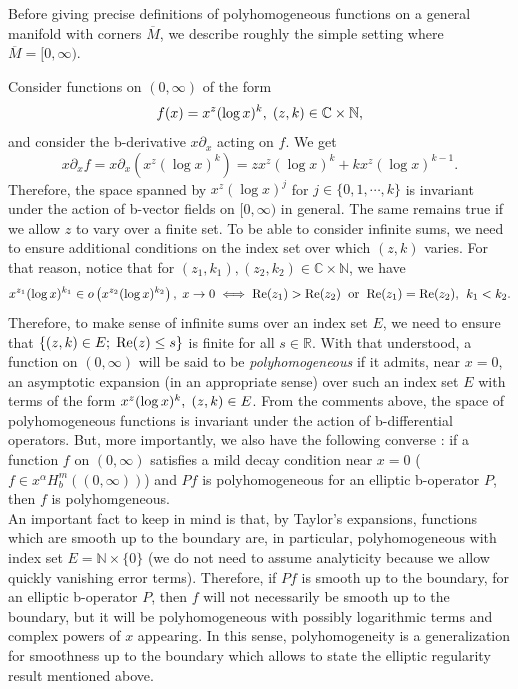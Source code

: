 \documentclass[a4paper,11pt]{article}
\def\C{\mathbb{C}}
\def\R{\mathbb{R}}
\def\N{\mathbb{N}}
\begin{document}
Before giving precise definitions of polyhomogeneous functions on a general manifold with corners $\overline{M}$, we describe roughly the simple setting where $\overline{M}=[0, \infty)$. 


Consider functions on $(0, \infty)$ of the form 
$$
f(x) = x^z (\log x)^k, \hspace{0.1cm} (z,k) \in \C \times \N,
$$
and consider the b-derivative $x \partial_x$ acting on $f$. We get 
$$
x \partial_x f = x \partial_x (x^z (\log x)^k) = z x^z (\log x)^k + k x^z (\log x)^{k-1}. 
$$
Therefore, the space spanned by $x^z (\log x)^j$ for $j \in \{ 0,1, \cdots, k \}$ is invariant under the action of b-vector fields on $[0, \infty)$ in general. The same remains true if we allow $z$ to vary over a finite set. To be able to consider infinite sums, we need to ensure additional conditions on the index set over which $(z,k)$ varies. For that reason, notice that for  $(z_1, k_1), (z_2,k_2) \in \C \times \N$, we have 
$$
x^{z_1} (\log x)^{k_1} \in o\left( x^{z_2} (\log x)^{k_2}\right), \hspace{0.1cm} x \rightarrow 0 \iff \mathrm{Re} (z_1) > \mathrm{Re}(z_2) \hspace{0.2cm} \text{or} \hspace{0.2cm} \mathrm{Re} (z_1) = \mathrm{Re}(z_2), \hspace{0.15cm} k_1 < k_2.
$$
Therefore, to make sense of infinite sums over an index set $E$, we need to ensure that $\{ (z,k) \in E; \hspace{0.1cm}  \mathrm{Re} (z) \leq s \}$ is finite for all $s \in \R$. With that understood, a function on $(0, \infty)$ will be said to be \emph{polyhomogeneous} if it admits, near $x =0$, an asymptotic expansion (in an appropriate sense) over such an index set $E$ with terms of the form $x^z (\log x)^k,\hspace{0.1cm} (z,k) \in E$. From the comments above, the space of polyhomogeneous functions is invariant under the action of b-differential operators. But, more importantly, we also have the following converse \cite[Proposition 5.61]{melrose_atiyah-patodi-singer_1993}: if a function $f$ on $(0, \infty)$ satisfies a mild decay condition near $x=0$ ($f \in x^{\alpha} H_b^m((0,\infty))$) and $P f$ is polyhomogeneous for an elliptic b-operator $P$, then $f$ is polyhomgeneous.\\

An important fact to keep in mind is that, by Taylor's expansions, functions which are smooth up to the boundary are, in particular, polyhomogeneous with index set $E = \N \times \{ 0\}$ (we do not need to assume analyticity because we allow quickly vanishing error terms). Therefore, if $P f$ is smooth up to the boundary, for an elliptic b-operator $P$, then $f$ will not necessarily be smooth up to the boundary, but it will be polyhomogeneous with possibly logarithmic terms and complex powers of $x$ appearing. In this sense, polyhomogeneity is a generalization for smoothness up to the boundary which allows to state the elliptic regularity result mentioned above.\\
\end{document}
